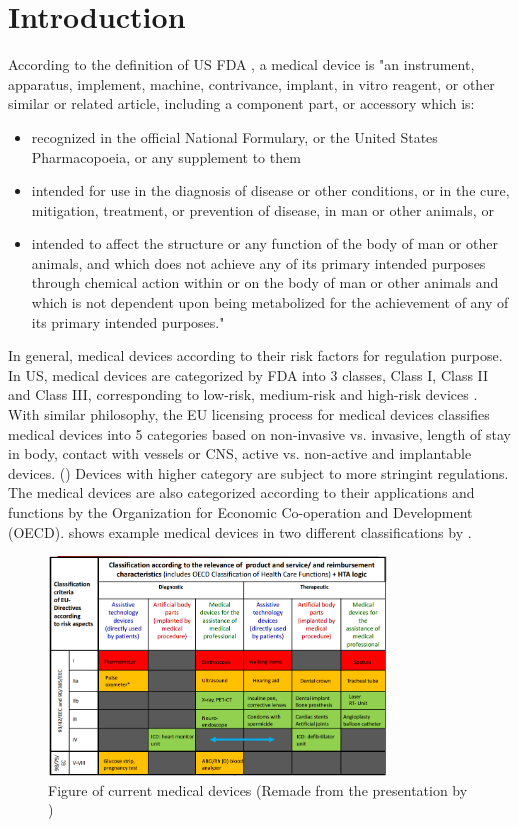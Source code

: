 \chapter{Introduction}
According to the definition of US FDA \cite{fda}, a medical device is "an instrument, apparatus, implement, machine, contrivance, implant, in vitro reagent, or other similar or related article, including a component part, or accessory which is:
\begin{itemize}
	\item recognized in the official National Formulary, or the United States Pharmacopoeia, or any supplement to them
	\item intended for use in the diagnosis of disease or other conditions, or in the cure, mitigation, treatment, or prevention of disease, in man or other animals, or
	\item intended to affect the structure or any function of the body of man or other animals, and which does not achieve any of its primary intended purposes through chemical action within or on the body of man or other animals and which is not dependent upon being metabolized for the achievement of any of its primary intended purposes."
\end{itemize}
In general, medical devices according to their risk factors for regulation purpose. In US, medical devices are categorized by FDA into 3 classes, Class I, Class II and Class III, corresponding to low-risk, medium-risk and high-risk devices \cite{class}. With similar philosophy, the EU licensing process for medical devices classifies medical devices into 5 categories based on non-invasive vs. invasive, length of stay in body, contact with vessels or CNS, active vs. non-active and implantable devices. (\cite{EU_classify}) Devices with higher category are subject to more stringint regulations. The medical devices are also categorized according to their applications and functions by the Organization for Economic Co-operation and Development (OECD)\cite{OECD}.  shows example medical devices in two different classifications by \cite{classify}.
\begin{figure}[t]
		\centering
		\includegraphics[width=0.8\textwidth]{figs/devices.png}
		\caption{\small Figure of current medical devices (Remade from the presentation by \cite{classify})}
		\label{fig:Cur}
\end{figure}
